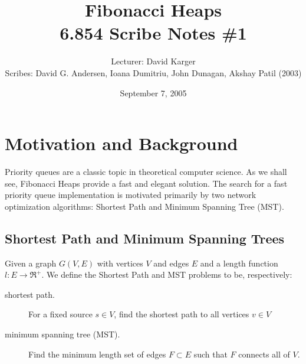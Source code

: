 \documentclass{article}
\title{Fibonacci Heaps\\ 6.854 Scribe Notes \#1}
\date{September 7, 2005}
\author{Lecturer: David Karger\\ Scribes: David G. Andersen,  Ioana Dumitriu, John Dunagan, Akshay Patil (2003)}
\begin{document}
%
%
%
%

%



\section{Motivation and Background}

Priority queues are a classic topic in theoretical computer
science. As we shall see, Fibonacci Heaps provide a fast and  elegant
solution. The
search for a fast priority queue implementation is motivated
primarily by two network optimization algorithms: Shortest Path and
Minimum Spanning Tree (MST).

\subsection{Shortest Path and Minimum Spanning Trees}

Given a graph $G (V,E)$ with vertices $V$ and edges $E$ and a length
function $l: E \rightarrow \Re^+$. We define the Shortest Path and MST
problems to be, respectively:
\begin{description}
\item[shortest path.]  For a fixed source $s \in V$, find the shortest
  path to all vertices $v \in V$
\item[minimum spanning tree (MST).]  Find the minimum length set of
  edges $F \subset E$ such that $F$ connects all of $V$.
\end{description}
\end{document}
